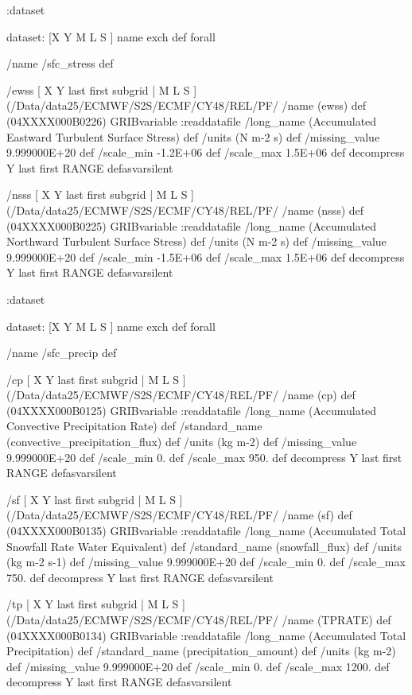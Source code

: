 \begin{ingrid}
:dataset

dataset:
[X Y M L S ] {name exch def } forall

/name /sfc_stress def

/ewss { [ X Y last first subgrid | M L S ] (/Data/data25/ECMWF/S2S/ECMF/CY48/REL/PF/%
/name (ewss) def
(04XXXX000B0226) GRIBvariable
:readdatafile
/long_name (Accumulated Eastward Turbulent Surface Stress) def
/units (N m-2 s) def
/missing_value 9.999000E+20 def
/scale_min -1.2E+06 def
/scale_max 1.5E+06 def
decompress
Y last first RANGE
} defasvarsilent

/nsss { [ X Y last first subgrid | M L S ] (/Data/data25/ECMWF/S2S/ECMF/CY48/REL/PF/%
/name (nsss) def
(04XXXX000B0225) GRIBvariable
:readdatafile
/long_name (Accumulated Northward Turbulent Surface Stress) def
/units (N m-2 s) def
/missing_value 9.999000E+20 def
/scale_min -1.5E+06 def
/scale_max 1.5E+06 def
decompress
Y last first RANGE
} defasvarsilent


:dataset

dataset:
[X Y M L S ] {name exch def } forall

/name /sfc_precip def

/cp { [ X Y last first subgrid | M L S ] (/Data/data25/ECMWF/S2S/ECMF/CY48/REL/PF/%
/name (cp) def
(04XXXX000B0125) GRIBvariable
:readdatafile
/long_name (Accumulated Convective Precipitation Rate) def
/standard_name (convective_precipitation_flux) def
/units (kg m-2) def
/missing_value 9.999000E+20 def
/scale_min 0. def
/scale_max 950. def
decompress
Y last first RANGE
} defasvarsilent

/sf { [ X Y last first subgrid | M L S ] (/Data/data25/ECMWF/S2S/ECMF/CY48/REL/PF/%
/name (sf) def
(04XXXX000B0135) GRIBvariable
:readdatafile
/long_name (Accumulated Total Snowfall Rate Water Equivalent) def
/standard_name (snowfall_flux) def
/units (kg m-2 s-1) def
/missing_value 9.999000E+20 def
/scale_min 0. def
/scale_max 750. def
decompress
Y last first RANGE
} defasvarsilent

/tp { [ X Y last first subgrid | M L S ] (/Data/data25/ECMWF/S2S/ECMF/CY48/REL/PF/%
/name (TPRATE) def
(04XXXX000B0134) GRIBvariable
:readdatafile
/long_name (Accumulated Total Precipitation) def
/standard_name (precipitation_amount) def
/units (kg m-2) def
/missing_value 9.999000E+20 def
/scale_min 0. def
/scale_max 1200. def
decompress
Y last first RANGE
} defasvarsilent


\end{ingrid}
